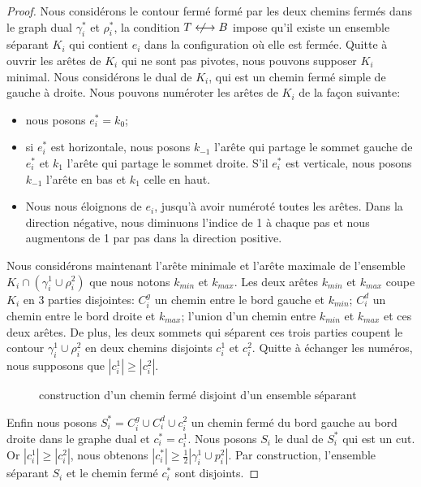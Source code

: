 \documentclass[titlepage,a4paper,12pt]{article}
\newcommand{\nlongleftrightarrow}{\longleftrightarrow \kern-15pt\not \kern15pt}
\begin{document}
\begin{proof}
Nous considérons le contour fermé formé par les deux chemins fermés dans le graph dual $\gamma_i^*$ et $\rho_i^*$, la condition $T\nlongleftrightarrow B$ impose qu'il existe un ensemble séparant $K_i$ qui contient $e_i$ dans la configuration où elle est fermée. Quitte à ouvrir les arêtes de $K_i$ qui ne sont pas pivotes, nous pouvons supposer $K_i$ minimal. Nous considérons le dual de $K_i$, qui est un chemin fermé simple de gauche à droite. Nous pouvons numéroter les arêtes de $K_i$ de la façon suivante:
\begin{itemize}[label = $\bullet$, leftmargin =*]
\item nous posons $e^*_i = k_0$;
\item si $e^*_i$ est horizontale, nous posons $k_{-1}$ l'arête qui partage le sommet gauche de $e^*_i$ et $k_1$ l'arête qui partage le sommet droite. S'il $e_i^*$ est verticale, nous posons $k_{-1}$ l'arête en bas et $k_1$ celle en haut.
\item Nous nous éloignons de $e_i$, jusqu'à avoir numéroté toutes les arêtes. Dans la direction négative, nous diminuons l'indice de 1 à chaque pas et nous augmentons de 1 par pas dans la direction positive.
\end{itemize}

Nous considérons maintenant l'arête minimale et l'arête maximale de l'ensemble $K_i\cap (\gamma_i^1\cup \rho_i^2)$ que nous notons $k_{min}$ et $k_{max}$. Les deux arêtes $k_{min}$ et $k_{max}$ coupe $K_i$ en 3 parties disjointes: $C^g_i$ un chemin entre le bord gauche et $k_{min}$; $C^d_i$ un chemin entre le bord droite et $k_{max}$; l'union d'un chemin entre $k_{min}$ et $k_{max}$ et ces deux arêtes. De plus, les deux sommets qui séparent ces trois parties coupent le contour $\gamma_i^1\cup \rho_i^2$ en deux chemins disjoints $c_i^1$ et $c_i^2$. Quitte à échanger les numéros, nous supposons que $|c_i^1| \geqslant |c_i^2|$.
\begin{figure}[h]
\center
{}
\caption{construction d'un chemin fermé disjoint d'un ensemble séparant}
\end{figure}

Enfin nous posons $S^*_i = C^g_i \cup C^d_i \cup c_i^2$ un chemin fermé du bord gauche au bord droite dans le graphe dual et $c_i^* = c_i^1$. Nous posons $S_i$ le dual de $S^*_i$ qui est un cut. Or $|c_i^1| \geqslant |c_i^2|$, nous obtenons $|c^*_i| \geqslant \frac{1}{2}|\gamma_i^1\cup p_i^2|$. Par construction, l'ensemble séparant $S_i$ et le chemin fermé $c_i^*$ sont disjoints.
\end{proof}
\end{document}
